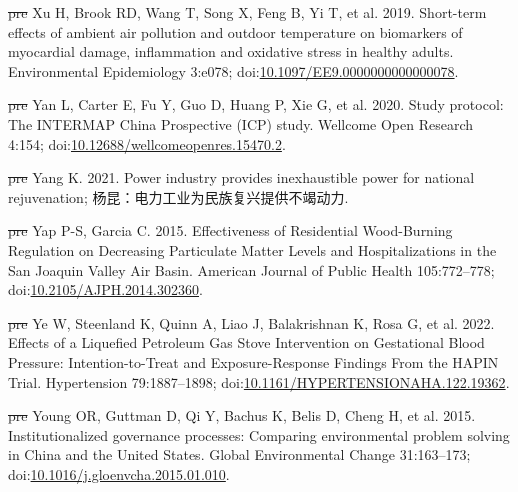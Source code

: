 \documentclass[
  letterpaper,
  DIV=11,
  numbers=noendperiod]{scrartcl}
\newlength{\cslhangindent}
\newenvironment{CSLReferences}[2] %
 {\begin{list}{}{%
  \setlength{\itemindent}{0pt} %
  \setlength{\leftmargin}{0pt} %
  \setlength{\parsep}{0pt} %
  \ifodd #1
   \setlength{\leftmargin}{\cslhangindent} %
   \setlength{\itemindent}{-1\cslhangindent} %
  \fi
  \setlength{\itemsep}{#2\baselineskip}}} %
 {\end{list}} %
\providecommand{\DIFdel}[1]{{\protect\color{red}\sout{#1}}}                      %
\providecommand{\DIFaddbegin}{} %
\providecommand{\DIFaddend}{} %
\providecommand{\DIFdelbegin}{} %
\providecommand{\DIFdelend}{} %
\newcommand{\DIFscaledelfig}{0.5}
\newlength{\DIFdelgraphicswidth} %
\newlength{\DIFdelgraphicsheight} %
\newcommand{\DIFaddincludegraphics}[2][]{{\color{blue}\fbox{\DIFOincludegraphics[#1]{#2}}}} %
\newcommand{\DIFdelincludegraphics}[2][]{%
\sbox{\DIFdelgraphicsbox}{\DIFOincludegraphics[#1]{#2}}%
\settoboxwidth{\DIFdelgraphicswidth}{\DIFdelgraphicsbox} %
\settoboxtotalheight{\DIFdelgraphicsheight}{\DIFdelgraphicsbox} %
\scalebox{\DIFscaledelfig}{%
\parbox[b]{\DIFdelgraphicswidth}{\usebox{\DIFdelgraphicsbox}\\[-\baselineskip] \rule{\DIFdelgraphicswidth}{0em}}\llap{\resizebox{\DIFdelgraphicswidth}{\DIFdelgraphicsheight}{%
\setlength{\unitlength}{\DIFdelgraphicswidth}%
\begin{picture}(1,1)%
\thicklines\linethickness{2pt} %
{\color[rgb]{1,0,0}\put(0,0){\framebox(1,1){}}}%
{\color[rgb]{1,0,0}\put(0,0){\line( 1,1){1}}}%
{\color[rgb]{1,0,0}\put(0,1){\line(1,-1){1}}}%
\end{picture}%
}\hspace*{3pt}}} %
} %
\DeclareRobustCommand{\DIFaddbegin}{\DIFOaddbegin \let\includegraphics\DIFaddincludegraphics} %
\DeclareRobustCommand{\DIFaddend}{\DIFOaddend \let\includegraphics\DIFOincludegraphics} %
\DeclareRobustCommand{\DIFdelbegin}{\DIFOdelbegin \let\includegraphics\DIFdelincludegraphics} %
\DeclareRobustCommand{\DIFdelend}{\DIFOaddend \let\includegraphics\DIFOincludegraphics} %
\begin{document}
\begin{CSLReferences}{1}{1}
\DIFdelbegin %
\DIFdel{pre}%
\DIFdelend \DIFaddbegin {}
\DIFaddend Xu H, Brook RD, Wang T, Song X, Feng B, Yi T, et al. 2019. Short-term
effects of ambient air pollution and outdoor temperature on biomarkers
of myocardial damage, inflammation and oxidative stress in healthy
adults. Environmental Epidemiology 3:e078;
doi:\href{https://doi.org/10.1097/EE9.0000000000000078}{10.1097/EE9.0000000000000078}.

\DIFdelbegin %
\DIFdel{pre}%
\DIFdelend \DIFaddbegin {}
\DIFaddend Yan L, Carter E, Fu Y, Guo D, Huang P, Xie G, et al. 2020. Study
protocol: {The INTERMAP China Prospective} ({ICP}) study. Wellcome Open
Research 4:154;
doi:\href{https://doi.org/10.12688/wellcomeopenres.15470.2}{10.12688/wellcomeopenres.15470.2}.

\DIFdelbegin %
\DIFdel{pre}%
\DIFdelend \DIFaddbegin {}
\DIFaddend Yang K. 2021. Power industry provides inexhaustible power for national
rejuvenation; 杨昆：电力工业为民族复兴提供不竭动力.

\DIFdelbegin %
\DIFdel{pre}%
\DIFdelend \DIFaddbegin {}
\DIFaddend Yap P-S, Garcia C. 2015. Effectiveness of {Residential Wood-Burning
Regulation} on {Decreasing Particulate Matter Levels} and
{Hospitalizations} in the {San Joaquin Valley Air Basin}. American
Journal of Public Health 105:772--778;
doi:\href{https://doi.org/10.2105/AJPH.2014.302360}{10.2105/AJPH.2014.302360}.

\DIFdelbegin %
\DIFdel{pre}%
\DIFdelend \DIFaddbegin {}
\DIFaddend Ye W, Steenland K, Quinn A, Liao J, Balakrishnan K, Rosa G, et al. 2022.
Effects of a {Liquefied Petroleum Gas Stove Intervention} on
{Gestational Blood Pressure}: {Intention-to-Treat} and
{Exposure-Response Findings From} the {HAPIN Trial}. Hypertension
79:1887--1898;
doi:\href{https://doi.org/10.1161/HYPERTENSIONAHA.122.19362}{10.1161/HYPERTENSIONAHA.122.19362}.

\DIFdelbegin %
\DIFdel{pre}%
\DIFdelend \DIFaddbegin {}
\DIFaddend Young OR, Guttman D, Qi Y, Bachus K, Belis D, Cheng H, et al. 2015.
Institutionalized governance processes: {Comparing} environmental
problem solving in {China} and the {United States}. Global Environmental
Change 31:163--173;
doi:\href{https://doi.org/10.1016/j.gloenvcha.2015.01.010}{10.1016/j.gloenvcha.2015.01.010}.


\end{CSLReferences}
\end{document}
